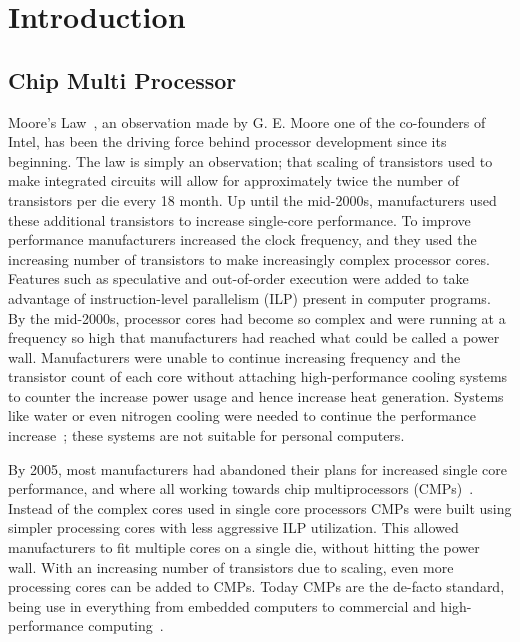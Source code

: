 \chapter{Introduction}
\label{cpt:introduction}

\section{Chip Multi Processor}

Moore's Law~\cite{Moore1998}, an observation made by G. E. Moore one of the co-founders of Intel, has been the driving force behind processor development since its beginning.
The law is simply an observation; that scaling of transistors used to make integrated circuits will allow for approximately twice the number of transistors per die every 18 month.
Up until the mid-2000s, manufacturers used these additional transistors to increase single-core performance.
To improve performance manufacturers increased the clock frequency, and they used the increasing number of transistors to make increasingly complex processor cores.
Features such as speculative and out-of-order execution were added to take advantage of instruction-level parallelism (ILP) present in computer programs.
By the mid-2000s, processor cores had become so complex and were running at a frequency so high that manufacturers had reached what could be called a power wall.
Manufacturers were unable to continue increasing frequency and the transistor count of each core without attaching high-performance cooling systems to counter the increase power usage and hence increase heat generation.
Systems like water or even nitrogen cooling were needed to continue the performance increase~\cite{Sutter2005}; these systems are not suitable for personal computers.

By 2005, most manufacturers had abandoned their plans for increased single core performance, and where all working towards chip multiprocessors (CMPs)~\cite{Sutter2005}.
Instead of the complex cores used in single core processors CMPs were built using simpler processing cores with less aggressive ILP utilization.
This allowed manufacturers to fit multiple cores on a single die, without hitting the power wall.
With an increasing number of transistors due to scaling, even more processing cores can be added to CMPs.
Today CMPs are the de-facto standard, being use in everything from embedded computers to commercial and high-performance computing~\cite{Thomadakis2011, Jain2013}.


